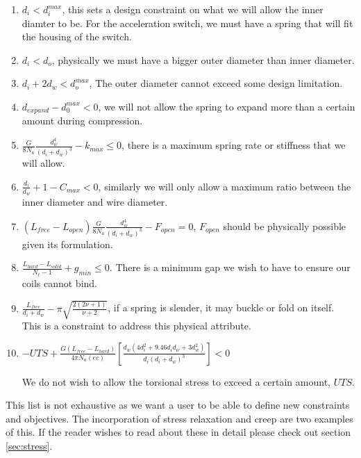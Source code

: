 \documentclass[10pt]{article}
\begin{document}
\begin{enumerate}
	\item $d_{i} < d_{i}^{max}$, this sets a design constraint on what we will allow the inner diamter to be. For the acceleration switch, we must have a spring that will fit the housing of the switch.
	\item $d_{i} < d_{o}$, physically we must have a bigger outer diameter than inner diameter.
	\item $d_{i} + 2d_{w} < d_{o}^{max}$, The outer diameter cannot exceed some design limitation.
	\item$d_{expand} - d_{0}^{max} < 0 $, we will not allow the spring to expand more than a certain amount during compression.
	\item$ \frac{G}{8N_{a}}\frac{d_{w}^{4}}{(d_{i} + d_{w})^{3}} - k_{max} \le 0 $, there is a maximum spring rate or stiffness that we will allow. 

	\item $\frac{d_{i}}{d_{w}} + 1 - C_{max}< 0$, similarly we will only allow a maximum ratio between the inner diameter and wire diameter. 

	\item $(L_{free} - L_{open})\frac{G}{8N_{a}}\frac{d_{w}^{4}}{(d_{i} + d_{w})^{3}} - F_{open} = 0 $, $F_{open}$ should be physically possible given its formulation.

	\item $\frac{L_{hard} - L_{solid}}{N_{t} - 1} + g_{min} \le  0$. There is a minimum gap we wish to have to ensure our coils cannot bind. 

	\item$\frac{L_{free}}{d_{i} + d_{w}} - \pi \sqrt{\frac{2(2 \nu + 1)}{\nu + 2}}$, if a spring is slender, it may buckle or fold on itself. This is a constraint to address this physical attribute. 

	\item$-UTS + \frac{G(L_{free} - L_{hard})}{4 \pi N_{a} (ec)} \left[\frac{d_{w} (4d_{i}^{2} + 9.46d_{i} 
d_{w} + 3 d_{w}^{2})}{d_{i}(d_{i}+d_{w})^{3}}\right] < 0$

We do not wish to allow the torsional stress to exceed a certain amount, $UTS$.

\end{enumerate}	

This list is not exhaustive as we want a user to be able to define new constraints and objectives. The incorporation of stress relaxation and creep are two examples of this. If the reader wishes to read about these in detail please check out section \ref{sec:stress}. 
\end{document}
